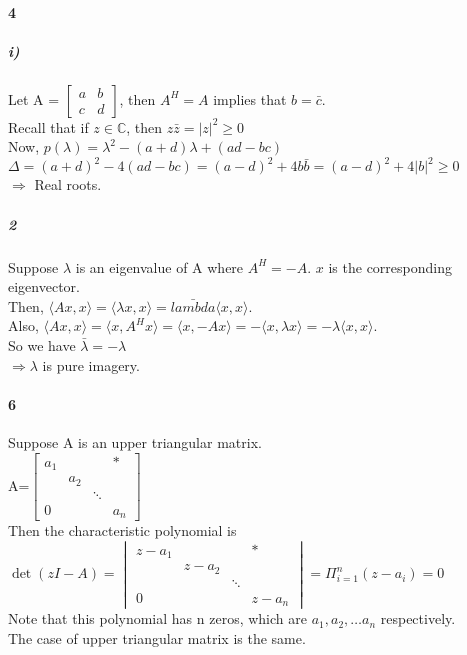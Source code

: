 \documentclass[10pt,letter]{article}
\begin{document}
\paragraph{4}
\subparagraph{i)} 
Let A = $\begin{bmatrix}
a&b\\c&d
\end{bmatrix}
$, then $A^H=A$ implies that $b=\bar{c}$. \\
Recall that if $z\in \mathbb{C}$, then $z\bar{z}=|z|^2\geq 0$\\
Now, $p(\lambda)=\lambda^2-(a+d)\lambda+(ad-bc)$\\
$\Delta=(a+d)^2-4(ad-bc)=(a-d)^2+4b\bar{b}=(a-d)^2+4|b|^2\geq 0$\\
$\Rightarrow$ Real roots. 
\subparagraph{2}
Suppose $\lambda$ is an eigenvalue of A where $A^H=-A$. $x$ is the corresponding eigenvector. \\
Then, $\langle Ax, x\rangle=\langle \lambda x, x\rangle=\bar{lambda}\langle x, x\rangle$. \\
Also, $\langle Ax, x\rangle=\langle x, A^Hx\rangle=\langle x, -Ax\rangle=-\langle x,\lambda x\rangle=-\lambda \langle x, x\rangle$. \\
So we have $\bar{\lambda}=-\lambda$\\
$\Rightarrow \lambda$ is pure imagery.  
\paragraph{6}
Suppose A is an upper triangular matrix.\\
A=$\begin{bmatrix}
a_1& & &*\\
 &a_2& & \\
 & &\ddots& \\
 0& & & a_n 
\end{bmatrix}$\\
Then the characteristic polynomial is \\
$\det (zI-A)=\begin{vmatrix}
z-a_1& & &*\\
&z-a_2& & \\
& &\ddots& \\
0& & & z-a_n 
\end{vmatrix}=\Pi_{i=1}^n(z-a_i)=0$\\
Note that this polynomial has n zeros, which are $a_1, a_2,\dots a_n$ respectively.\\
The case of upper triangular matrix is the same. 
\end{document}
